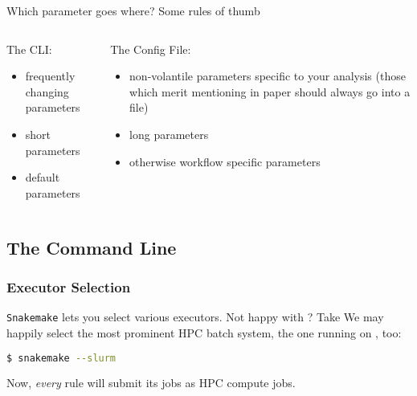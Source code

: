 \begin{frame}
  \pause
  \begin{exampleblock}{Which parameter goes where? Some rules of thumb}
    \begin{columns}[t]
      \begin{column}{0.5\textwidth}
        The CLI:
        \begin{itemize}
         \item frequently changing parameters
         \item short parameters
         \item default parameters
        \end{itemize}
      \end{column}
      \begin{column}{0.5\textwidth}
        The Config File:
        \begin{itemize}
         \item non-volantile parameters specific to your analysis (those which merit mentioning in paper should always go into a file)
         \item long parameters
         \item otherwise workflow specific parameters
        \end{itemize}
      \end{column}
    \end{columns}
  \end{exampleblock}
\end{frame}


\subsection{The Command Line}

\begin{frame}[fragile]
  \frametitle{Executor Selection}
  \texttt{Snakemake} lets you select various executors. Not happy with \mogon? Take  \newline
  We may happily select the most prominent HPC batch system, the one running on \mogon, too:
  \begin{lstlisting}[language=Bash, style=Shell]
$ snakemake --slurm
  \end{lstlisting}
  Now, \emph{every} rule will submit its jobs as HPC compute jobs.
\end{frame}

